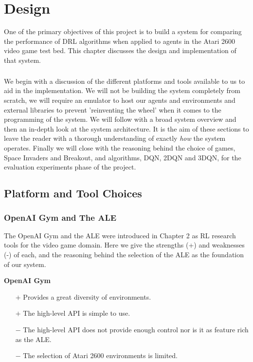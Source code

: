 \chapter{Design} \label{ch:design}
One of the primary objectives of this project is to build a system for comparing the performance of DRL algorithms when applied to agents in the Atari 2600 video game test bed. This chapter discusses the design and implementation of that system. \paragraph{}

We begin with a discussion of the different platforms and tools available to us to aid in the implementation. We will not be building the system completely from scratch, we will require an emulator to host our agents and environments and external libraries to prevent 'reinventing the wheel' when it comes to the programming of the system. We will follow with a broad system overview and then an in-depth look at the system architecture. It is the aim of these sections to leave the reader with a thorough understanding of exactly \textit{how} the system operates. Finally we will close with the reasoning behind the choice of games, Space Invaders and Breakout, and algorithms, DQN, 2DQN and 3DQN, for the evaluation experiments phase of the project.

\section{Platform and Tool Choices}
\subsection{OpenAI Gym and The ALE}
The OpenAI Gym and the ALE were introduced in Chapter 2 as RL research tools for the video game domain. Here we give the strengths (+) and weaknesses (-) of each, and the reasoning behind the selection of the ALE as the foundation of our system.

\textbf{OpenAI Gym}
\begin{itemize}
	\item[$+$] Provides a great diversity of environments.
	\item[$+$] The high-level API is simple to use.
	\item[$-$] The high-level API does not provide enough control nor is it as feature rich as the ALE.
	\item[$-$] The selection of Atari 2600 environments is limited.
\end{itemize}


